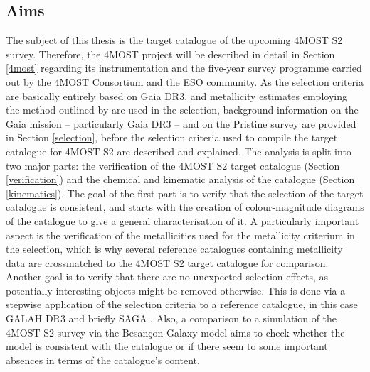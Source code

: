 \documentclass[a4paper,11pt]{article}
\begin{document}
\subsection{Aims} \label{aims}
The subject of this thesis is the target catalogue of the upcoming 4MOST S2 survey. Therefore, the 4MOST project will be described in detail in Section \ref{4most} regarding its instrumentation and the five-year survey programme carried out by the 4MOST Consortium and the ESO community. As the selection criteria are basically entirely based on Gaia DR3, and metallicity estimates employing the method outlined by \citet{pristine} are used in the selection, background information on the Gaia mission -- particularly Gaia DR3 -- and on the Pristine survey are provided in Section \ref{selection}, before the selection criteria used to compile the target catalogue for 4MOST S2 are described and explained. The analysis is split into two major parts: the verification of the 4MOST S2 target catalogue (Section \ref{verification}) and the chemical and kinematic analysis of the catalogue (Section \ref{kinematics}). The goal of the first part is to verify that the selection of the target catalogue is consistent, and starts with the creation of colour-magnitude diagrams of the catalogue to give a general characterisation of it. A particularly important aspect is the verification of the metallicities used for the metallicity criterium in the selection, which is why several reference catalogues containing metallicity data are crossmatched to the 4MOST S2 target catalogue for comparison. Another goal is to verify that there are no unexpected selection effects, as potentially interesting objects might be removed otherwise. This is done via a stepwise application of the selection criteria to a reference catalogue, in this case GALAH DR3 \citep{galahdr3} and briefly SAGA \citep{saga}. Also, a comparison to a simulation of the 4MOST S2 survey via the Besan\c{c}on Galaxy model aims to check whether the model is consistent with the catalogue or if there seem to some important absences in terms of the catalogue's content.\\ \\
%
\end{document}

